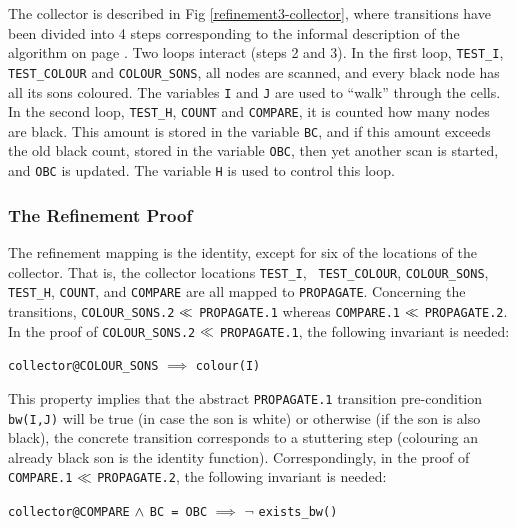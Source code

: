 \noindent The collector is described in Fig \ref{refinement3-collector}, 
where transitions have been 
divided into 4 steps corresponding  to the informal description of the
algorithm    on page    \pageref{the-collector-informal}\@.   Two  loops
interact (steps 2   and 3)\@.  In the   first loop, {\tt  TEST\_I}, {\tt
  TEST\_COLOUR} and   {\tt COLOUR\_SONS}, all   nodes are scanned, and
every black node has all its sons coloured. The variables {\tt I} and
{\tt J} are  used to ``walk'' through the  cells.  In the second loop,
{\tt TEST\_H}, {\tt COUNT}  and {\tt COMPARE},  it is counted how many
nodes are black.  This amount is stored in the  variable {\tt BC}, and
if this amount exceeds  the old  black count,  stored in  the variable
{\tt OBC}, then yet another scan is started, and {\tt OBC} is updated.
The variable {\tt H} is used to control this loop.


\subsubsection{The Refinement Proof}

The refinement mapping  is the identity, except  for six of the locations
of  the collector.  That is,  the collector locations {\tt TEST\_I}, {\tt
  TEST\_COLOUR}, {\tt COLOUR\_SONS}, {\tt  TEST\_H}, {\tt COUNT},  and
{\tt COMPARE} are  all mapped to  {\tt  PROPAGATE}\@. 
Concerning   the  transitions,  
{\tt  COLOUR\_SONS.2} $\ll$ {\tt PROPAGATE.1} 
whereas  
{\tt COMPARE.1} $\ll$ {\tt PROPAGATE.2}.    
In  the   proof   of  
{\tt  COLOUR\_SONS.2} $\ll$ {\tt PROPAGATE.1}, 
the following invariant is needed:

\begin{center}
  {\tt collector@COLOUR\_SONS} $\implies$ {\tt colour(I)}
\end{center}

\noindent
This property    implies   that the  abstract   {\tt    PROPAGATE.1}
transition pre-condition {\tt bw(I,J)} will be true (in case the son
is white)  or otherwise  (if  the  son is  also  black),  the concrete
transition corresponds to  a  stuttering  step (colouring an   already
black son is the identity function)\@.  Correspondingly, in the proof of
{\tt  COMPARE.1}  $\ll$  {\tt   PROPAGATE.2},  the  following
invariant is needed:

\begin{center}
  {\tt collector@COMPARE} $\wedge$ {\tt BC = OBC} $\implies$ 
  $\neg$ {\tt exists\_bw()}
\end{center}

